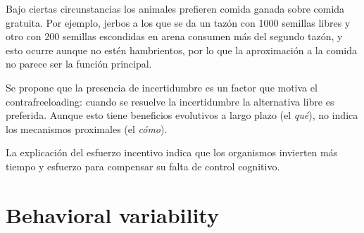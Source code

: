 \documentclass[a4paper,12pt]{article}
\begin{document}
Bajo ciertas circunstancias los animales prefieren comida ganada sobre comida gratuita.
Por ejemplo, jerbos a los que se da un tazón con 1000 semillas libres y otro con 200 semillas escondidas en arena consumen más del segundo tazón, y esto ocurre aunque no estén hambrientos, por lo que la aproximación a la comida no parece ser la función principal.

Se propone que la presencia de incertidumbre es un factor que motiva el contrafreeloading: cuando se resuelve la incertidumbre la alternativa libre es preferida.
Aunque esto tiene beneficios evolutivos a largo plazo (el {\itshape qué}), no indica los mecanismos proximales (el {\itshape cómo}).

La explicación del esfuerzo incentivo indica que los organismos invierten más tiempo y esfuerzo para compensar su falta de control cognitivo.

\section{Behavioral variability}
\end{document}
